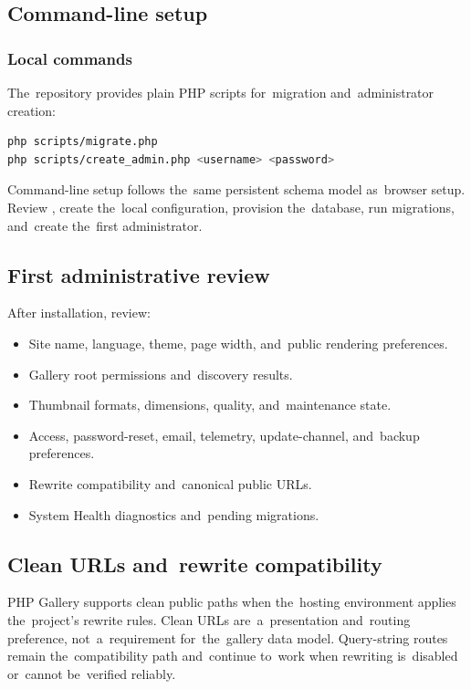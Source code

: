 \documentclass[11pt,a4paper]{article}
\newcommand{\filepath}[1]{\path{#1}}
\begin{document}
\subsection{Command-line setup}

\subsubsection{Local commands}

The~repository provides plain PHP scripts for~migration and~administrator
creation:

\begin{lstlisting}[language=bash]
php scripts/migrate.php
php scripts/create_admin.php <username> <password>
\end{lstlisting}

Command-line setup follows the~same persistent schema model as~browser setup.
Review \filepath{config.example.php}, create the~local configuration, provision
the~database, run migrations, and~create the~first administrator.

\subsection{First administrative review}

After installation, review:

\begin{itemize}
  \item Site name, language, theme, page width, and~public rendering
  preferences.
  \item Gallery root permissions and~discovery results.
  \item Thumbnail formats, dimensions, quality, and~maintenance state.
  \item Access, password-reset, email, telemetry, update-channel, and~backup
  preferences.
  \item Rewrite compatibility and~canonical public URLs.
  \item System Health diagnostics and~pending migrations.
\end{itemize}

\subsection{Clean URLs and~rewrite compatibility}

PHP Gallery supports clean public paths when the~hosting environment applies
the~project's rewrite rules. Clean URLs are~a~presentation and~routing
preference, not~a~requirement for~the~gallery data model. Query-string routes
remain the~compatibility path and~continue to~work when rewriting is~disabled
or~cannot be~verified reliably.
\end{document}

